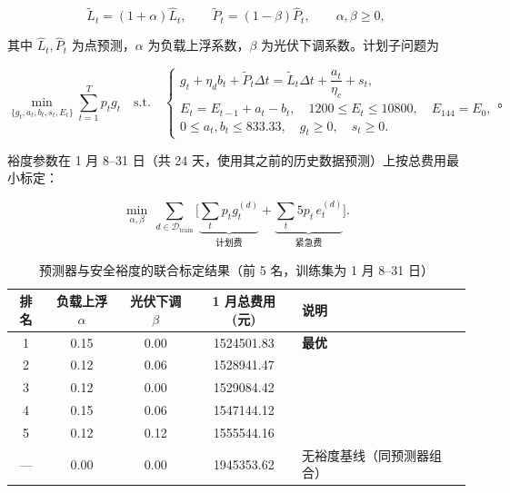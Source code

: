\begin{equation}
  \tilde L_t=(1+\alpha)\hat L_t,\qquad \tilde P_t=(1-\beta)\hat P_t,\qquad \alpha,\beta\ge0,
  \label{eq:p2-margin}
\end{equation}

其中 $\hat L_t,\hat P_t$ 为点预测，$\alpha$ 为负载上浮系数，$\beta$ 为光伏下调系数。计划子问题为

\begin{equation}
  \min_{\{g_t,a_t,b_t,s_t,E_t\}}\sum_{t=1}^{T}p_tg_t
  \quad\text{s.t.}\quad
  \begin{cases}
    g_t+\eta_db_t+\tilde P_t\Delta t=\tilde L_t\Delta t+\dfrac{a_t}{\eta_c}+s_t,\\
    E_t=E_{t-1}+a_t-b_t,\quad 1200\le E_t\le10800,\quad E_{144}=E_0,\\
    0\le a_t,b_t\le833.33,\quad g_t\ge0,\quad s_t\ge0 .
  \end{cases}\text{。}
  \label{eq:p2-sub}
\end{equation}

裕度参数在 1 月 8--31 日（共 24 天，使用其之前的历史数据预测）上按总费用最小标定：

\begin{equation}
  \min_{\alpha,\beta}\ \sum_{d\in\mathcal D_{\text{train}}}
  \Big[\underbrace{\sum_t p_tg_t^{(d)}}_{\text{计划费}}+\underbrace{\sum_t5p_t\,e_t^{(d)}}_{\text{紧急费}}\Big].
  \label{eq:p2-calib}
\end{equation}

\begin{table}[H]
  \centering
  \caption{预测器与安全裕度的联合标定结果（前 5 名，训练集为 1 月 8--31 日）}
  \label{tab:p2-margin}
  \small
  \begin{tabular}{ccccl}
    \toprule[1.5pt]
    排名 & 负载上浮 $\alpha$ & 光伏下调 $\beta$ & 1 月总费用 (元) & 说明 \\
    \midrule[1pt]
    1 & 0.15 & 0.00 & 1524501.83 & \textbf{最优} \\
    2 & 0.12 & 0.06 & 1528941.47 & \\
    3 & 0.12 & 0.00 & 1529084.42 & \\
    4 & 0.15 & 0.06 & 1547144.12 & \\
    5 & 0.12 & 0.12 & 1555544.16 & \\
    \midrule[1pt]
    --- & 0.00 & 0.00 & 1945353.62 & 无裕度基线（同预测器组合） \\
    \bottomrule[1.5pt]
  \end{tabular}
\end{table}

